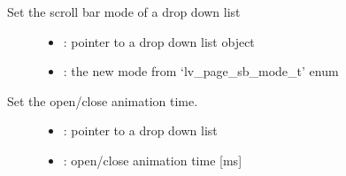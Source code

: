 \documentclass[letterpaper,10pt,english]{sphinxmanual}
\begin{document}

\begin{fulllineitems}
\label{\detokenize{object-types/ddlist:_CPPv421lv_ddlist_set_sb_modeP8lv_obj_t12lv_sb_mode_t}}%
\pysigstartmultiline
{}\label{\detokenize{object-types/ddlist:lv__ddlist_8h_1af26142ab6d7eefe7e422d24dd63ac775}}%
\pysigstopmultiline
Set the scroll bar mode of a drop down list \begin{description}
\item[{}] \leavevmode\begin{itemize}
\item {} 
: pointer to a drop down list object 

\item {} 
: the new mode from ‘lv\_page\_sb\_mode\_t’ enum 

\end{itemize}

\end{description}


\end{fulllineitems}


\begin{fulllineitems}
\label{\detokenize{object-types/ddlist:_CPPv423lv_ddlist_set_anim_timeP8lv_obj_t8uint16_t}}%
\pysigstartmultiline
{}\label{\detokenize{object-types/ddlist:lv__ddlist_8h_1a89b752b01e3eb6e7e657359fc0eb345d}}%
\pysigstopmultiline
Set the open/close animation time. \begin{description}
\item[{}] \leavevmode\begin{itemize}
\item {} 
: pointer to a drop down list 

\item {} 
: open/close animation time {[}ms{]} 

\end{itemize}

\end{description}


\end{fulllineitems}
\end{document}

